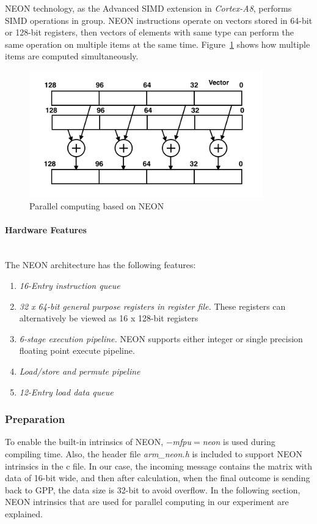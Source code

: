 NEON technology, as the Advanced SIMD extension in \emph{Cortex-A8}, performs SIMD operations in group. 
NEON instructions operate on vectors stored in 64-bit or 128-bit registers, 
then vectors of elements with same type can perform the same operation on multiple items at the same time.
Figure~\ref{fig:neon} shows how multiple items are computed simultaneously. 

\begin{figure}[h]
\centering
\includegraphics[width=0.9\textwidth]{images/neon}
\caption{Parallel computing based on NEON}
\label{fig:neon}
\end{figure}

\paragraph{Hardware Features}
~\\
The NEON architecture has the following features\cite{hardware}:
\begin{enumerate}
\item \emph{16-Entry instruction queue}
\item \emph{32 x 64-bit general purpose registers in register file.}
These registers can alternatively be viewed as 16 x 128-bit registers
\item \emph{6-stage execution pipeline.}
NEON supports either integer or single precision floating point execute pipeline.
\item \emph{Load/store and permute pipeline}
\item \emph{12-Entry load data queue}
\end{enumerate}

\subsubsection{Preparation}
To enable the built-in intrinsics of NEON, 
\emph{$-$mfpu$=$neon}\cite{ARMoptions} is used during compiling time.
Also, the header file \emph{arm\_neon.h} is included 
to support NEON intrinsics in the c file.
In our case, the incoming message contains the matrix with data of 16-bit wide, 
and then after calculation, when the final outcome is sending back to GPP, the data size is 32-bit to avoid overflow.
In the following section, NEON intrinsics that are used for parallel computing in our experiment are explained.

